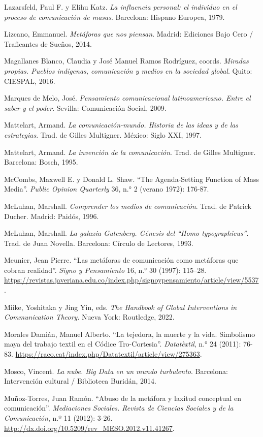 \documentclass{tufte-handout}
\begin{document}
\begin{hangparas}{.25in}{1}
Lazarsfeld, Paul F. y Elihu Katz. \emph{La influencia personal: el
individuo en el proceso de comunicación de masas}. Barcelona: Hispano
Europea, 1979.

Lizcano, Emmanuel. \emph{Metáforas que nos piensan}. Madrid: Ediciones
Bajo Cero / Traficantes de Sueños, 2014.

Magallanes Blanco, Claudia y José Manuel Ramos Rodríguez, coords.
\emph{Miradas propias. Pueblos indígenas, comunicación y medios en la
sociedad global}. Quito: CIESPAL, 2016.

Marques de Melo, José. \emph{Pensamiento comunicacional latinoamericano.
Entre el saber y el poder}. Sevilla: Comunicación Social, 2009.

Mattelart, Armand. \emph{La comunicación-mundo. Historia de las ideas y
de las estrategias}. Trad. de Gilles Multigner. México: Siglo XXI, 1997.

Mattelart, Armand. \emph{La invención de la comunicación}. Trad. de
Gilles Multigner. Barcelona: Bosch, 1995.

McCombs, Maxwell E. y Donald L. Shaw. ``The Agenda-Setting Function of
Mass Media''. \emph{Public Opinion Quarterly} 36, n.° 2 (verano 1972):
176-87.

McLuhan, Marshall. \emph{Comprender los medios de comunicación}. Trad.
de Patrick Ducher. Madrid: Paidós, 1996.

McLuhan, Marshall. \emph{La galaxia Gutenberg. Génesis del ``Homo
typographicus''}. Trad. de Juan Novella. Barcelona: Círculo de Lectores,
1993.

Meunier, Jean Pierre. ``Las metáforas de comunicación como metáforas que
cobran realidad''. \emph{Signo y Pensamiento} 16, n.° 30 (1997):
115--28.
\url{https://revistas.javeriana.edu.co/index.php/signoypensamiento/article/view/5537}.

Miike, Yoshitaka y Jing Yin, eds. \emph{The Handbook of Global
Interventions in Communication Theory}. Nueva York: Routledge, 2022.

Morales Damián, Manuel Alberto. ``La tejedora, la muerte y la vida.
Simbolismo maya del trabajo textil en el Códice Tro-Cortesia''.
\emph{Datatèxtil}, n.° 24 (2011): 76-83.
\url{https://raco.cat/index.php/Datatextil/article/view/275363}.

Mosco, Vincent. \emph{La nube. Big Data en un mundo turbulento}.
Barcelona: Intervención cultural / Biblioteca Buridán, 2014.

Muñoz-Torres, Juan Ramón. ``Abuso de la metáfora y laxitud conceptual en
comunicación''. \emph{Mediaciones Sociales. Revista de Ciencias Sociales
y de la Comunicación}, n.º 11 (2012): 3-26.
\url{http://dx.doi.org/10.5209/rev_MESO.2012.v11.41267}.


\end{hangparas}
\end{document}

